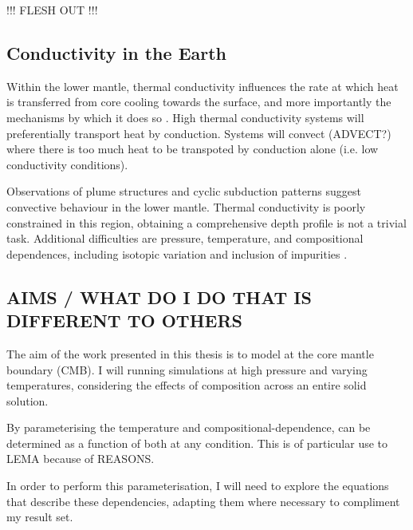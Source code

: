 !!! FLESH OUT !!!

\subsection{Conductivity in the Earth}

Within the lower mantle, thermal conductivity influences the rate at which heat is transferred from core cooling towards the surface, and more importantly the mechanisms by which it does so \citep{Lay2008}. High thermal conductivity systems will preferentially transport heat by conduction. Systems will convect (ADVECT?) where there is too much heat to be transpoted by conduction alone (i.e. low conductivity conditions).

Observations of plume structures and cyclic subduction patterns \citep[see][]{Garnero2008} suggest convective behaviour in the lower mantle. Thermal conductivity is poorly constrained in this region, obtaining a comprehensive depth profile is not a trivial task. Additional difficulties are pressure, temperature, and compositional dependences, including isotopic variation \citep{Tang2010,Dalton2013,Tang2014} and inclusion of impurities \citep{Manthilake2011,Ammann2014,Ohta2014}.

\subsection{AIMS / WHAT DO I DO THAT IS DIFFERENT TO OTHERS}

The aim of the work presented in this thesis is to model \tcs at the core mantle boundary (CMB). I will running simulations at high pressure and varying temperatures, considering the effects of composition across an entire solid solution. 

By parameterising the temperature and compositional-dependence, \tcs can be determined as a function of both at any condition. This is of particular use to LEMA because of REASONS. 

In order to perform this parameterisation, I will need to explore the equations that describe these dependencies, adapting them where necessary to compliment my result set.

